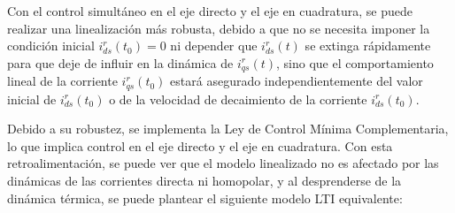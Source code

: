 \documentclass[blue,fullpaper]{ludusofficial}  %
\begin{document}
\begin{enumerate}
    Con el control simultáneo en el eje directo y el eje en cuadratura, se puede realizar una linealización más robusta, debido a que no se necesita imponer la condición inicial $i_{ds}^{r}(t_0) = 0$ ni depender que $i_{ds}^{r}(t)$ se extinga rápidamente para que deje de influir en la dinámica de $i_{qs}^{r}(t)$, sino que el comportamiento lineal de la corriente $i_{qs}^{r}(t_0)$ estará asegurado independientemente del valor inicial de $i_{ds}^{r}(t_0)$ o de la velocidad de decaimiento de la corriente $i_{ds}^{r}(t_0)$.
\end{enumerate}

Debido a su robustez, se implementa la Ley de Control Mínima Complementaria, lo que implica control en el eje directo y el eje en cuadratura. Con esta retroalimentación, se puede ver que el modelo linealizado no es afectado por las dinámicas de las corrientes directa ni homopolar, y al desprenderse de la dinámica térmica, se puede plantear el siguiente modelo LTI equivalente:
\end{document}
